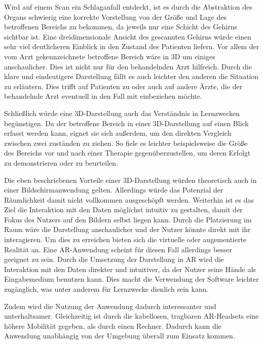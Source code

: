Wird auf einem Scan ein Schlaganfall entdeckt, ist es durch die Abstraktion des Organs schwierig eine korrekte Vorstellung von der Größe und Lage des betroffenen Bereichs zu bekommen, da jeweils nur eine Schicht des Gehirns sichtbar ist. 
Eine dreidimensionale Ansicht des gescannten Gehirns würde einen sehr viel deutlicheren Einblick in den Zustand des Patienten liefern. Vor allem der vom Arzt gekennzeichnete betroffene Bereich wäre in 3D um einiges anschaulicher. Dies ist nicht nur für den behandelnden Arzt hilfreich. Durch die klare und eindeutigere Darstellung fällt es auch leichter den anderen die Situation zu erläutern. Dies trifft auf Patienten zu oder auch auf andere Ärzte, die der behandelnde Arzt eventuell in den Fall mit einbeziehen möchte.

Schließlich würde eine 3D-Darstellung auch das Verständnis in Lernzwecken begünstigen.
Da der betroffene Bereich in einer 3D-Darstellung auf einen Blick erfasst werden kann, eignet sie sich außerdem, um den direkten Vergleich zwischen zwei zuständen zu ziehen. So fiele es leichter beispielsweise die Größe des Bereichs vor und nach einer Therapie gegenüberzustellen, um deren Erfolgt zu demonstrieren oder zu beurteilen.

Die eben beschriebenen Vorteile einer 3D-Darstellung würden theoretisch auch in einer Bildschirmanwendung gelten. Allerdings würde das Potenzial der Räumlichkeit damit nicht vollkommen ausgeschöpft werden. 
Weiterhin ist es das Ziel die Interaktion mit den Daten möglichst intuitiv zu gestalten, damit der Fokus des Nutzers auf den Bildern selbst liegen kann.
Durch die Platzierung im Raum wäre die Darstellung anschaulicher und der Nutzer könnte direkt mit ihr interagieren. 
Um dies zu erreichen bieten sich die virtuelle oder augementierte Realität an. 
Eine AR-Anwendung scheint für diesen Fall allerdings besser geeignet zu sein. Durch die Umsetzung der Darstellung in AR wird die Interaktion mit den Daten direkter und intuitiver, da der Nutzer seine Hände als Eingabemedium benutzen kann. Dies macht die Verwendung der Software leichter zugänglich, was unter anderem für Lernzwecke dienlich sein kann.


Zudem wird die Nutzung der Anwendung dadurch interessanter und unterhaltsamer.
Gleichzeitig ist durch die kabellosen, tragbaren AR-Headsets eine höhere Mobilität gegeben, als durch einen Rechner. Dadurch kann die Anwendung unabhängig von der Umgebung überall zum Einsatz kommen. 

